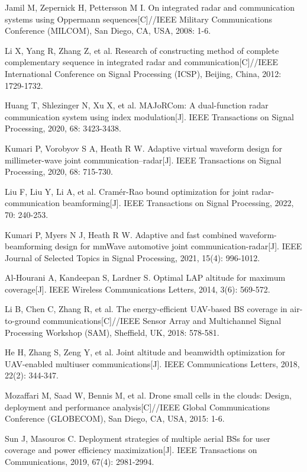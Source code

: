 \noindent
[13]\quad Jamil M, Zepernick H, Pettersson M I. On integrated radar and communication systems using Oppermann sequences[C]//IEEE Military Communications Conference (MILCOM), San Diego, CA, USA, 2008: 1-6.

\noindent
[14]\quad Li X, Yang R, Zhang Z, et al. Research of constructing method of complete complementary sequence in integrated radar and communication[C]//IEEE International Conference on Signal Processing (ICSP), Beijing, China, 2012: 1729-1732.

\noindent
[15]\quad Huang T, Shlezinger N, Xu X, et al. MAJoRCom: A dual-function radar communication system using index modulation[J]. IEEE Transactions on Signal Processing, 2020, 68: 3423-3438.

\noindent
[16]\quad Kumari P, Vorobyov S A, Heath R W. Adaptive virtual waveform design for millimeter-wave joint communication--radar[J]. IEEE Transactions on Signal Processing, 2020, 68: 715-730.

\noindent
[17]\quad Liu F, Liu Y, Li A, et al. Cram\'{e}r-Rao bound optimization for joint radar-communication beamforming[J]. IEEE Transactions on Signal Processing, 2022, 70: 240-253.

\noindent
[18]\quad Kumari P, Myers N J, Heath R W. Adaptive and fast combined waveform-beamforming design for mmWave automotive joint communication-radar[J]. IEEE Journal of Selected Topics in Signal Processing, 2021, 15(4): 996-1012.

\noindent
[19]\quad Al-Hourani A, Kandeepan S, Lardner S. Optimal LAP altitude for maximum coverage[J]. IEEE Wireless Communications Letters, 2014, 3(6): 569-572.

\noindent
[20]\quad Li B, Chen C, Zhang R, et al. The energy-efficient UAV-based BS coverage in air-to-ground communications[C]//IEEE Sensor Array and Multichannel Signal Processing Workshop (SAM), Sheffield, UK, 2018: 578-581.

\noindent
[21]\quad He H, Zhang S, Zeng Y, et al. Joint altitude and beamwidth optimization for UAV-enabled multiuser communications[J]. IEEE Communications Letters, 2018, 22(2): 344-347.

\noindent
[22]\quad Mozaffari M, Saad W, Bennis M, et al. Drone small cells in the clouds: Design, deployment and performance analysis[C]//IEEE Global Communications Conference (GLOBECOM), San Diego, CA, USA, 2015: 1-6.

\noindent
[23]\quad Sun J, Masouros C. Deployment strategies of multiple aerial BSs for user coverage and power efficiency maximization[J]. IEEE Transactions on Communications, 2019, 67(4): 2981-2994.


